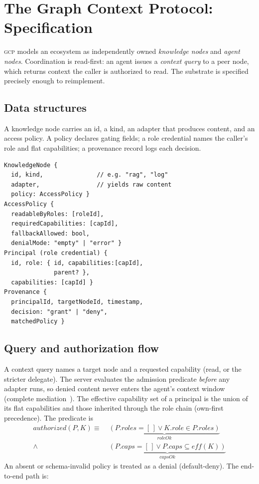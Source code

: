 \documentclass[conference,letterpaper]{IEEEtran}
\newcommand{\gcp}{\textsc{gcp}}
\begin{document}
\section{The Graph Context Protocol: Specification}
\label{sec:arch}

\gcp{} models an ecosystem as independently owned \emph{knowledge nodes} and \emph{agent nodes}.
Coordination is read-first: an agent issues a \emph{context query} to a peer node, which returns
context the caller is authorized to read. The substrate is specified precisely enough to
reimplement.

\subsection{Data structures}
A knowledge node carries an id, a kind, an adapter that produces content, and an access
policy. A policy declares gating fields; a role credential names the caller's role
and flat capabilities; a provenance record logs each decision.

{\small
\begin{verbatim}
KnowledgeNode {
  id, kind,               // e.g. "rag", "log"
  adapter,                // yields raw content
  policy: AccessPolicy }
AccessPolicy {
  readableByRoles: [roleId],
  requiredCapabilities: [capId],
  fallbackAllowed: bool,
  denialMode: "empty" | "error" }
Principal (role credential) {
  id, role: { id, capabilities:[capId],
              parent? },
  capabilities: [capId] }
Provenance {
  principalId, targetNodeId, timestamp,
  decision: "grant" | "deny",
  matchedPolicy }
\end{verbatim}}

\subsection{Query and authorization flow}
A context query names a target node and a requested capability (read, or the stricter delegate).
The server evaluates the admission predicate \emph{before} any adapter runs, so denied content
never enters the agent's context window (complete mediation~\citep{saltzer1975}). The effective
capability set of a principal is the union of its flat capabilities and those inherited through the
role chain (own-first precedence). The predicate is
\begin{align*}
\mathit{authorized}(P,K)\equiv\;
&\underbrace{(P.\textit{roles}{=}[\,]\vee K.\textit{role}{\in}P.\textit{roles})}_{\textit{roleOk}}\\
\wedge\;
&\underbrace{(P.\textit{caps}{=}[\,]\vee P.\textit{caps}{\subseteq}\mathit{eff}(K))}_{\textit{capsOk}}
\end{align*}
An absent or schema-invalid policy is treated as a denial (default-deny). The end-to-end path is:
\end{document}

